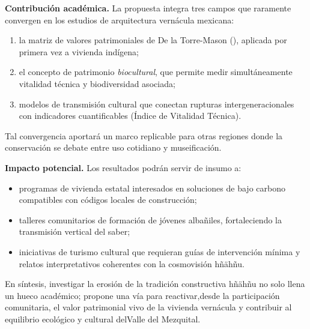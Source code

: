 \textbf{Contribución académica.}
La propuesta integra tres campos que raramente convergen en los estudios de arquitectura vernácula mexicana:

\begin{enumerate}
	\item la matriz de valores patrimoniales de De la Torre-Mason (\citeyear{delatorre2002values}), aplicada por primera vez a vivienda indígena;
	\item el concepto de patrimonio \emph{biocultural}, que permite medir simultáneamente vitalidad técnica y biodiversidad asociada;
	\item modelos de transmisión cultural que conectan rupturas intergeneracionales con indicadores cuantificables (Índice de Vitalidad Técnica).
\end{enumerate}

Tal convergencia aportará un marco replicable para otras regiones
donde la conservación se debate entre uso cotidiano y museificación.

\textbf{Impacto potencial.}
Los resultados podrán servir de insumo a:

\begin{itemize}
	\item programas de vivienda estatal interesados en soluciones de bajo carbono compatibles con códigos locales de construcción;
	\item talleres comunitarios de formación de jóvenes albañiles, fortaleciendo la transmisión vertical del saber;
	\item iniciativas de turismo cultural que requieran guías de intervención mínima y relatos interpretativos coherentes con la cosmovisión hñähñu.
\end{itemize}

En síntesis, investigar la erosión de la tradición constructiva hñähñu no solo llena un hueco académico; propone una vía para reactivar,desde la participación comunitaria, el valor patrimonial vivo de la vivienda vernácula y contribuir al equilibrio ecológico y cultural delValle del Mezquital.
